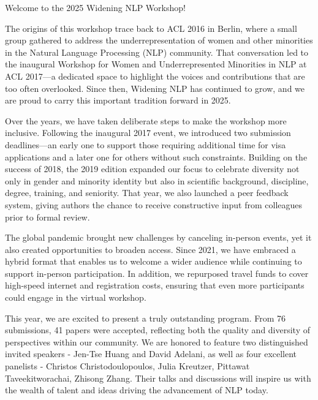 Welcome to the 2025 Widening NLP Workshop!

\vspace{\baselineskip}

The origins of this workshop trace back to ACL 2016 in Berlin, where a small group gathered to address the underrepresentation of women and other minorities in the Natural Language Processing (NLP) community. That conversation led to the inaugural Workshop for Women and Underrepresented Minorities in NLP at ACL 2017—a dedicated space to highlight the voices and contributions that are too often overlooked. Since then, Widening NLP has continued to grow, and we are proud to carry this important tradition forward in 2025.

\vspace{\baselineskip}

Over the years, we have taken deliberate steps to make the workshop more inclusive. Following the inaugural 2017 event, we introduced two submission deadlines—an early one to support those requiring additional time for visa applications and a later one for others without such constraints. Building on the success of 2018, the 2019 edition expanded our focus to celebrate diversity not only in gender and minority identity but also in scientific background, discipline, degree, training, and seniority. That year, we also launched a peer feedback system, giving authors the chance to receive constructive input from colleagues prior to formal review. 

\vspace{\baselineskip}

The global pandemic brought new challenges by canceling in-person events, yet it also created opportunities to broaden access. Since 2021, we have embraced a hybrid format that enables us to welcome a wider audience while continuing to support in-person participation. In addition, we repurposed travel funds to cover high-speed internet and registration costs, ensuring that even more participants could engage in the virtual workshop.

\vspace{\baselineskip}

This year, we are excited to present a truly outstanding program. From 76 submissions, 41 papers were accepted, reflecting both the quality and diversity of perspectives within our community. We are honored to feature two distinguished invited speakers - Jen-Tse Huang and David Adelani, as well as four excellent panelists - Christos Christodoulopoulos, Julia Kreutzer, Pittawat Taveekitworachai, Zhisong Zhang. Their talks and discussions will inspire us with the wealth of talent and ideas driving the advancement of NLP today.

